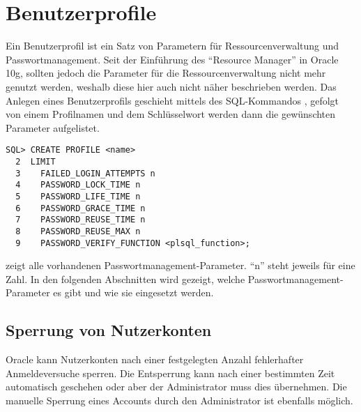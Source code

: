     \section{Benutzerprofile}
      \label{userprofiles}
      Ein Benutzerprofil ist ein Satz von Parametern für Ressourcenverwaltung
      und Passwortmanagement. Seit der Einführung des \enquote{Resource
      Manager} in Oracle 10g, sollten jedoch die Parameter für die
      Ressourcenverwaltung nicht mehr genutzt werden, weshalb diese hier auch
      nicht näher beschrieben werden. Das Anlegen eines Benutzerprofils
      geschieht mittels des SQL-Kommandos ,
      gefolgt von einem Profilnamen und dem Schlüsselwort
       werden dann die gewünschten Parameter
      aufgelistet.
        \begin{lstlisting}[caption={Anzahl fehlerhafter Anmeldeversuche
        konfigurieren},label=admin216,language=oracle_sql]
SQL> CREATE PROFILE <name>
  2  LIMIT
  3    FAILED_LOGIN_ATTEMPTS n
  4    PASSWORD_LOCK_TIME n
  5    PASSWORD_LIFE_TIME n
  6    PASSWORD_GRACE_TIME n
  7    PASSWORD_REUSE_TIME n
  8    PASSWORD_REUSE_MAX n
  9    PASSWORD_VERIFY_FUNCTION <plsql_function>;
        \end{lstlisting}
         zeigt alle vorhandenen Passwortmanagement-Parameter. \enquote{n} steht jeweils für eine Zahl. In den folgenden Abschnitten wird gezeigt, welche Passwortmanagement-Parameter es gibt und wie sie eingesetzt werden.
      \subsection{Sperrung von Nutzerkonten}
        Oracle kann Nutzerkonten nach einer festgelegten Anzahl fehlerhafter Anmeldeversuche sperren. Die Entsperrung kann nach einer bestimmten Zeit automatisch geschehen oder aber der Administrator muss dies übernehmen. Die manuelle Sperrung eines Accounts durch den Administrator ist ebenfalls möglich.

